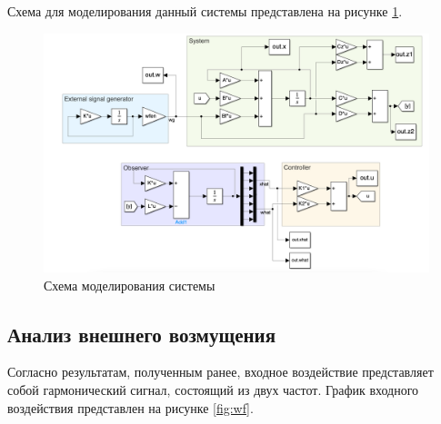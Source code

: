 Схема для моделирования данный системы представлена на рисунке \ref{fig:scheme3}.
\begin{figure}[ht!]
    \centering
    \includegraphics[width=\textwidth]{media/scheme3.png}
    \caption{Схема моделирования системы}
    \label{fig:scheme3}
\end{figure}

\subsection{Анализ внешнего возмущения}
Согласно результатам, полученным ранее, входное воздействие представляет собой 
гармонический сигнал, состоящий из двух частот. График входного воздействия
представлен на рисунке \ref{fig:wf}.

